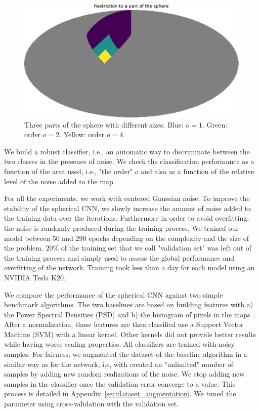\documentclass[final,twocolumn,3p,times,authoryear]{elsarticle}
\newcommand{\todo}[1]{{\color[rgb]{.6,.1,.6}{#1}}}
\newcommand{\1}{\b{1}}              %
\newcommand{\0}{\b{0}}              %
\begin{document}
\begin{figure}[!ht]
\centering
\includegraphics[width=\linewidth]{figures/part_sphere.pdf}
\caption{Three parts of the sphere with different sizes. Blue: $o=1$. Green: order $o=2$. Yellow: order $o=4$.}
\label{fig:subpart_sphere}
\end{figure}

We build a robust classifier, i.e., an automatic way to
discriminate between the two classes in the presence of noise.
We check the classification performance as a function of the area used, i.e., "the order" $o$ and also as a function of the relative level of the noise added to the map.

For all the
experiments, we work with centered Gaussian noise. \todo{Tomek: could you put a
justification.} To improve the
stability of the spherical CNN, we slowly increase the amount of noise added to
the training data over the iterations. Furthermore in order to avoid
overfitting, the noise is randomly produced during the training process. We trained our
model between $50$ and $290$ epochs depending on the complexity and the size of
the problem. $20\%$ of the training set that we call "validation set" was left out of the training process and simply used to assess the global performance and overfitting of
the network.
Training took less than a day for each model using an NVIDIA Tesla K20.

We compare the performance of the spherical CNN against two simple benchmark
algorithms. The two baselines are based on building features with a) the Power
Spectral Densities (PSD) and b) the histogram of pixels in the maps~\cite{patton2017cosmologicalconstraints}.
After a normalization, those features are then classified use a Support Vector
Machine (SVM) with a linear kernel. Other kernels did not provide better results
while having worse scaling properties. All classifiers are trained with noisy samples. For fairness, we augmented the dataset
of the baseline algorithm in a similar way as for the network, i.e, with
created an "unlimited" number of samples by adding new random realizations of
the noise. We stop adding new samples in the classifier once the validation
error converge to a value. This process is detailed in Appendix~\ref{sec:dataset_augmentation}. We tuned the parameter using cross-validation with the validation set.
\end{document}
